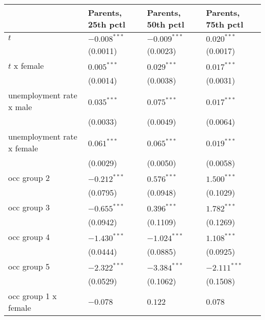 \begin{tabular}{llll}
\toprule
{} & Parents, 25th pctl & Parents, 50th pctl & Parents, 75th pctl \\
\midrule
$t$                                    &     $-0.008^{***}$ &     $-0.009^{***}$ &      $0.020^{***}$ \\
                                       &           (0.0011) &           (0.0023) &           (0.0017) \\
$t$ x female                           &      $0.005^{***}$ &      $0.029^{***}$ &      $0.017^{***}$ \\
                                       &           (0.0014) &           (0.0038) &           (0.0031) \\
unemployment rate x male               &      $0.035^{***}$ &      $0.075^{***}$ &      $0.017^{***}$ \\
                                       &           (0.0033) &           (0.0049) &           (0.0064) \\
unemployment rate x female             &      $0.061^{***}$ &      $0.065^{***}$ &      $0.019^{***}$ \\
                                       &           (0.0029) &           (0.0050) &           (0.0058) \\
occ group 2                            &     $-0.212^{***}$ &      $0.576^{***}$ &      $1.500^{***}$ \\
                                       &           (0.0795) &           (0.0948) &           (0.1029) \\
occ group 3                            &     $-0.655^{***}$ &      $0.396^{***}$ &      $1.782^{***}$ \\
                                       &           (0.0942) &           (0.1109) &           (0.1269) \\
occ group 4                            &     $-1.430^{***}$ &     $-1.024^{***}$ &      $1.108^{***}$ \\
                                       &           (0.0444) &           (0.0885) &           (0.0925) \\
occ group 5                            &     $-2.322^{***}$ &     $-3.384^{***}$ &     $-2.111^{***}$ \\
                                       &           (0.0529) &           (0.1062) &           (0.1508) \\
occ group 1 x female                   &           $-0.078$ &            $0.122$ &            $0.078$ \\

\end{tabular}
